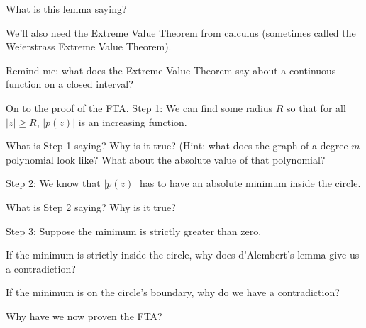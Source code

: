 \documentclass[nooutcomes]{ximera}
\begin{document}
\begin{question}
    What is this lemma saying?
\end{question}

We'll also need the Extreme Value Theorem from calculus (sometimes called the Weierstrass Extreme Value Theorem).
\begin{question}
    Remind me: what does the Extreme Value Theorem say about a continuous function on a closed interval?
\end{question}

On to the proof of the FTA.  Step 1: We can find some radius $R$ so that for all $\vert z \vert \geq R$, $\vert p(z) \vert$ is an increasing function.

\begin{question}
    What is Step 1 saying?  Why is it true? (Hint: what does the graph of a degree-$m$ polynomial look like?  What about the absolute value of that polynomial?
\end{question}

Step 2: We know that $\vert p(z) \vert$ has to have an absolute minimum inside the circle.
\begin{question}
    What is Step 2 saying?  Why is it true?
\end{question}

Step 3: Suppose the minimum is strictly greater than zero.
\begin{question}
    If the minimum is strictly inside the circle, why does d'Alembert's lemma give us a contradiction?
\end{question}

\begin{question}
    If the minimum is on the circle's boundary, why do we have a contradiction?
\end{question}

\begin{question}
    Why have we now proven the FTA?
\end{question}
\end{document}
